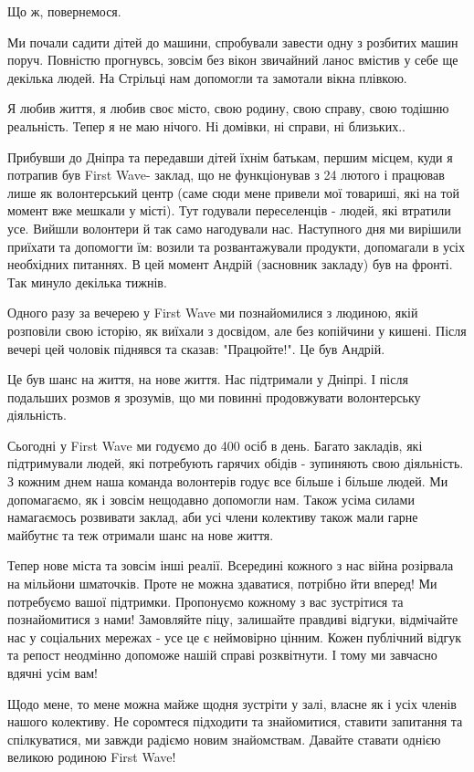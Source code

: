 Що ж, повернемося.  

Ми почали садити дітей до машини, спробували завести одну з розбитих машин
поруч. Повністю прогнувсь, зовсім без вікон звичайний ланос вмістив у себе ще
декілька людей. На Стрільці нам допомогли та замотали вікна плівкою. 

Я любив життя, я любив своє місто, свою родину, свою справу, свою тодішню
реальність. Тепер я не маю нічого. Ні домівки, ні справи, ні близьких.. 

Прибувши до Дніпра та передавши дітей їхнім батькам, першим місцем, куди я
потрапив був First Wave- заклад, що не функціонував з 24 лютого і працював лише
як волонтерський центр (саме сюди мене привели мої товариші, які на той момент
вже мешкали у місті). Тут годували переселенців - людей, які втратили усе.
Вийшли волонтери й так само нагодували нас. Наступного дня ми вирішили приїхати
та допомогти їм: возили та розвантажували продукти, допомагали в усіх
необхідних питаннях. В цей момент Андрій (засновник закладу) був на фронті. Так
минуло декілька тижнів. 

Одного разу за вечерею у First Wave ми познайомилися з людиною, якій розповіли
свою історію, як виїхали з досвідом, але без копійчини у кишені. Після вечері
цей чоловік піднявся та сказав: "Працюйте!". Це був Андрій. 

Це був шанс на життя, на нове життя. Нас підтримали у Дніпрі. І після подальших
розмов я зрозумів, що ми повинні продовжувати волонтерську діяльність. 

Сьогодні у First Wave ми годуємо до 400 осіб в день. Багато закладів, які
підтримували людей, які потребують гарячих обідів - зупиняють свою діяльність.
З кожним днем наша команда волонтерів годує все більше і більше людей. Ми
допомагаємо, як і зовсім нещодавно допомогли нам. Також усіма силами
намагаємось розвивати заклад, аби усі члени колективу також мали гарне майбутнє
та теж отримали шанс на нове життя. 

Тепер нове міста та зовсім інші реалії. Всередині кожного з нас війна розірвала
на мільйони шматочків. Проте не можна здаватися, потрібно йти вперед! Ми
потребуємо вашої підтримки. Пропонуємо кожному з вас зустрітися та
познайомитися з нами! Замовляйте піцу, залишайте правдиві відгуки, відмічайте
нас у соціальних мережах - усе це є неймовірно цінним. Кожен публічний відгук
та репост неодмінно допоможе нашій справі розквітнути. І тому ми завчасно
вдячні усім вам! 

Щодо мене, то мене можна майже щодня зустріти у залі, власне як і усіх членів
нашого колективу. Не соромтеся підходити та знайомитися, ставити запитання та
спілкуватися, ми завжди радіємо новим знайомствам. Давайте ставати однією
великою родиною First Wave!


